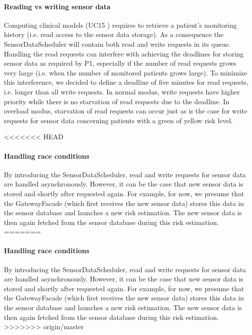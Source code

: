\documentclass[a4paper,10pt]{article}
\begin{document}
\paragraph{Reading vs writing sensor data}
Computing clinical models (UC15 ) requires to retrieve a patient’s monitoring history (i.e. read access to the sensor data storage). As a consequence the SensorDataScheduler will contain both read and write requests in its queue. Handling the read requests can interfere with achieving the deadlines for storing sensor data as required by P1, especially if the number of read requests grows very large (i.e. when the number of monitored patients grows large). To minimize this interference, we decided to define a deadline of five minutes for read requests, i.e. longer than all write requests. In normal modus, write requests have higher priority while there is no starvation of read requests due to the deadline. In overload modus, starvation of read requests can occur just as is the case for write requests for sensor data concerning patients with a green of yellow risk level.

<<<<<<< HEAD
\paragraph{Handling race conditions} By introducing the SensorDataScheduler, read and write requests for sensor data are handled asynchronously. However, it can be the case that new sensor data is stored and shortly after requested again. For example, for now, we presume that the GatewayFacade (which first receives the new sensor data) stores this data in the sensor database and launches a new risk estimation. The new sensor data is then again fetched from the sensor database during this risk estimation.\\
=======
\paragraph{Handling race conditions} By introducing the SensorDataScheduler, read and write requests for sensor data are handled asynchronously. However, it can be the case that new sensor data is stored and shortly after requested again. For example, for now, we presume that the GatewayFacade (which first receives the new sensor data) stores this data in the sensor database and launches a new risk estimation. The new sensor data is then again fetched from the sensor database during this risk estimation.
\\
>>>>>>> origin/master
\end{document}
